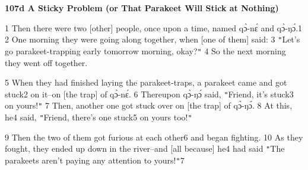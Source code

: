 
\textbf{107d A Sticky Problem (or That Parakeet Will Stick at Nothing)}

1 Then there were two [other] people, once upon a time, named qɔ̀-nɛ́ and qɔ̀-ŋɔ́.1
2 One morning they were going along together, when [one of them] said: 3 \texttt{"}Let's
go parakeet-trapping early tomorrow morning, okay?\texttt{"} 4 So the next morning
they went off together.

5 When they had finished laying the parakeet-traps, a parakeet came and got stuck2
on it--on [the trap] of qɔ̀-nɛ́. 6 Thereupon qɔ̀-ŋɔ́ said, \texttt{"}Friend,
it's stuck3 on yours!\texttt{"} 7 Then, another one got stuck over on [the trap]
of qɔ̀-ŋɔ́. 8 At this, he4 said, \texttt{"}Friend, there's one stuck5 on yours
too!\texttt{"}

9 Then the two of them got furious at each other6 and began fighting. 10 As they
fought, they ended up down in the river--and [all because] he4 had said \texttt{"}The
parakeets aren't paying any attention to yours!\texttt{"}7

